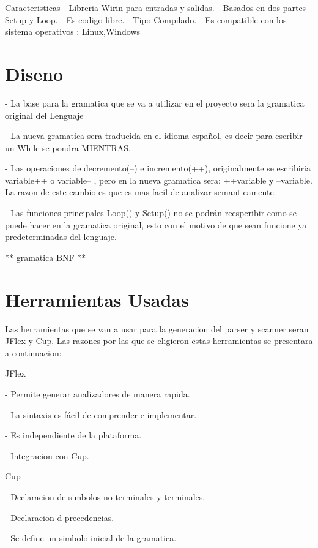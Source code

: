 \documentclass[11pt,twocolumn,spanish]{article}
\begin{document}
Caracteristicas
 - Libreria Wirin para entradas y salidas.
 - Basados en dos partes Setup y Loop.
 - Es codigo libre. 
 - Tipo Compilado. 
 - Es compatible con los sistema operativos : Linux,Windows
\section{Diseno}
- La base para la gramatica que se va a utilizar en el proyecto sera la gramatica original del Lenguaje

- La nueva gramatica sera  traducida en el idioma español, es decir para escribir un While se pondra MIENTRAS. 

- Las operaciones de decremento(--) e incremento(++), originalmente se escribiria variable++ o variable-- , pero en la nueva gramatica sera: ++variable y --variable. La razon de este cambio es que es mas facil de analizar semanticamente. 

- Las funciones principales Loop() y Setup() no se podrán reespcribir como se puede hacer en la gramatica original, esto con el motivo de que sean funcione ya predeterminadas del lenguaje. 

** gramatica BNF **
\section{Herramientas Usadas}
Las herramientas que se van a usar para la generacion del parser y scanner seran JFlex y Cup. Las razones por las que se eligieron estas herramientas se presentara a continuacion:

         JFlex
        
                    - Permite generar analizadores de manera rapida.
                    
                    - La sintaxis es fácil de comprender e implementar.
                    
                    - Es independiente de la plataforma. 
                    
                    - Integracion con Cup.
                    
                
        Cup
        
                    - Declaracion de simbolos no terminales y terminales.
                    
                    - Declaracion d precedencias. 
                    
                    - Se define un simbolo inicial de la gramatica.
                    
\end{document}
